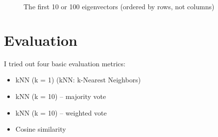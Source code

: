 \documentclass[11pt]{report}
\begin{document}
\begin{figure}[H]
  \centering
  \caption{The first 10 or 100 eigenvectors (ordered by rows, not columns)}
  \label{fig:100eigenvectors}
\end{figure}

\section{Evaluation}

I tried out four basic evaluation metrics:

\begin{itemize}
  \item kNN (k = 1) \hfill (kNN: k-Nearest Neighbors)
  \item kNN (k = 10) -- majority vote
  \item kNN (k = 10) -- weighted vote
  \item Cosine similarity
\end{itemize}
\end{document}
